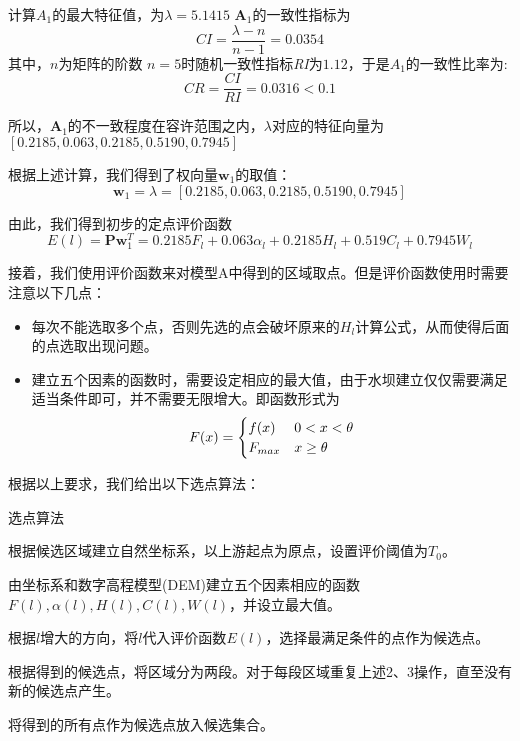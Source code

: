 \documentclass[nocover]{cumcmart}
\begin{document}
计算$A_{1}$的最大特征值，为$\lambda = 5.1415$
$\textbf{A}_1$的一致性指标为
\[\mathit{CI} = \frac{\lambda - n}{n - 1} = 0.0354\]
其中，$n$为矩阵的阶数
$n = 5$时随机一致性指标\textit{RI}为$1.12$，于是$A_{1}$的一致性比率为:
\[\mathit{CR} = \frac{\mathit{CI}}{\mathit{RI}} = 0.0316 < 0.1 \]

所以，$\textbf{A}_1$的不一致程度在容许范围之内，$\lambda$对应的特征向量为$\left[0.2185, 0.063, 0.2185, 0.5190, 0.7945\right]$

根据上述计算，我们得到了权向量$\textbf{w}_{1}$的取值：
\begin{equation}
\textbf{w}_{1} = \lambda = \left[0.2185, 0.063, 0.2185, 0.5190, 0.7945\right]
\end{equation}

由此，我们得到初步的定点评价函数
\begin{equation}
E(l) = \textbf{P}\textbf{w}_{1}^{T} = 0.2185F_l + 0.063{\alpha}_{l} + 0.2185H_l + 0.519C_l + 0.7945W_l
\end{equation}

接着，我们使用评价函数来对模型A中得到的区域取点。但是评价函数使用时需要注意以下几点：
\begin{itemize}
\item 每次不能选取多个点，否则先选的点会破坏原来的$H_l$计算公式，从而使得后面的点选取出现问题。
\item 建立五个因素的函数时，需要设定相应的最大值，由于水坝建立仅仅需要满足适当条件即可，并不需要无限增大。即函数形式为
\begin{eqnarray}
F(x) =
\begin{cases}
f(x) & 0 < x < \theta \cr F_{max} & x \ge \theta
\end{cases}
\end{eqnarray}
\end{itemize}


根据以上要求，我们给出以下选点算法：
\begin{framed}
\begin{list}{.}
    {\setlength{\parsep}{0ex}\setlength{\itemsep}{0ex}}
\item[] 选点算法
\item 根据候选区域建立自然坐标系，以上游起点为原点，设置评价阈值为$T_{0}$。
\item 由坐标系和数字高程模型(DEM)建立五个因素相应的函数$F(l),\alpha(l),H(l),C(l),W(l)$，并设立最大值。
\item 根据$l$增大的方向，将$l$代入评价函数$E(l)$，选择最满足条件的点作为候选点。
\item 根据得到的候选点，将区域分为两段。对于每段区域重复上述2、3操作，直至没有新的候选点产生。
\item 将得到的所有点作为候选点放入候选集合。
\end{list}
\end{framed}
\end{document}
